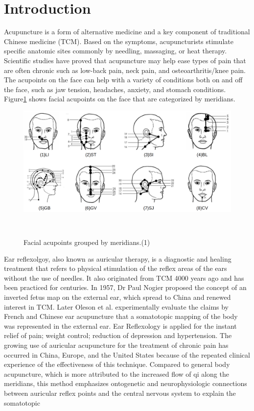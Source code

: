 \section{Introduction}
\label{intro}
Acupuncture\cite{li2015acupoint} is a form of alternative medicine and a key component of traditional Chinese medicine (TCM). Based on the symptoms, acupuncturists stimulate specific anatomic sites commonly by needling, massaging, or heat therapy. Scientific studies have proved that acupuncture may help ease types of pain that are often chronic such as low-back pain, neck pain, and osteoarthritis/knee pain. The acupoints on the face can help with a variety of conditions both on and off the face, such as jaw tension, headaches, anxiety, and stomach conditions. Figure\ref{fig:face-meridians} shows facial acupoints on the face that are categorized by meridians.\\
\begin{figure}
  \centering
    \includegraphics[width=\columnwidth]{figures/face-meridians.png}
    \caption{Facial acupoints grouped by meridians.(1)}~\label{fig:face-meridians}
  \end{figure}
Ear reflexolgoy, also known as auricular therapy, is a diagnostic and healing treatment that refers to physical stimulation of the reflex areas of the ears without the use of needles. It also originated from TCM 4000 years ago and has been practiced for centuries. In 1957, Dr Paul Nogier\cite{nogier1956pavillon} proposed the concept of an inverted fetus map on the external ear, which spread to China and renewed interest in TCM\cite{gori2007ear}. Later Oleson et al.\cite{oleson1980experimental} experimentally evaluate the claims by French and Chinese ear acupuncture that a somatotopic mapping of the body was represented in the external ear. Ear Reflexology is applied for the instant relief of pain\cite{oleson1993randomized}\cite{weintraub2008complementary}; weight control\cite{yao2019effect}; reduction of depression\cite{wu2018transcutaneous} and hypertension. The growing use of auricular acupuncture for the treatment of chronic pain has occurred in China, Europe, and the United States because of the repeated clinical experience of the effectiveness of this technique. Compared to general body acupuncture, which is more attributed to the increased flow of qi along the meridians, this method emphasizes ontogenetic and neurophysiologic connections between auricular reflex points and the central nervous system to explain the somatotopic
